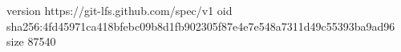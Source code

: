 version https://git-lfs.github.com/spec/v1
oid sha256:4fd45971ca418bfebc09b8d1fb902305f87e4e7e548a7311d49c55393ba9ad96
size 87540

